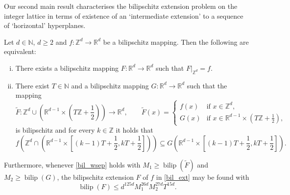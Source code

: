 \documentclass[a4paper, bibliography=totoc]{scrartcl}
\numberwithin{claimcounter}{define}
\newcommand{\R}{\mathbb{R}}
\newcommand{\Z}{\mathbb{Z}}
\newcommand{\N}{\mathbb{N}}
\newcommand{\bilip}{\operatorname{bilip}}
\newcommand{\br}[1]{\left(#1\right)}
\newcommand{\wt}[1]{\widetilde{#1}}
\begin{document}
Our second main result characterises the bilipschitz extension problem on the integer lattice in terms of existence of an `intermediate extension' to a sequence of `horizontal' hyperplanes.
\begin{thm}\label{thm:bil_ext_equiv}
	Let $d\in\N$, $d\geq2$ and $f\colon\Z^{d}\to\R^{d}$ be a bilipschitz mapping.
	Then the following are equivalent:
	\begin{enumerate}[(i)]
		\item\label{bil_ext} There exists a bilipschitz mapping $F\colon \R^{d}\to \R^{d}$ such that $F|_{\Z^{d}}=f$.
		\item\label{bil_wsep} There exist $T\in\N$ and a bilipschitz mapping $G\colon \R^{d}\to\R^{d}$ such that the mapping
		\begin{equation*}
		\wt{F}\colon \Z^{d}\cup \br{\R^{d-1}\times\br{T\Z+\frac{1}{2}}}\to \R^{d}, \qquad \wt{F}(x)=\begin{cases}
		f(x) & \text{if }x\in\Z^{d},\\
		G(x) & \text{if }x\in \R^{d-1}\times\br{T\Z+\frac{1}{2}},
		\end{cases}
		\end{equation*}
		is bilipschitz and for every $k\in\Z$ it holds that
		\[
		f\br{\Z^d\cap \br{\R^{d-1}\times\left[(k-1)T+\frac{1}{2},kT+\frac{1}{2}\right]}}\subseteq G\br{\R^{d-1}\times\left[(k-1)T+\frac{1}{2},kT+\frac{1}{2}\right]}.
		\]
	\end{enumerate}
	Furthermore, whenever \eqref{bil_wsep} holds with $M_{1}\geq \bilip(\wt{F})$ and $M_{2}\geq \bilip(G)$, the bilipschitz extension $F$ of $f$ in \eqref{bil_ext} may be found with
	\begin{equation*}
	\bilip(F)\leq d^{125d}M_{1}^{26d}M_{2}^{27d}T^{15d}.
	\end{equation*}
\end{thm}
\end{document}
